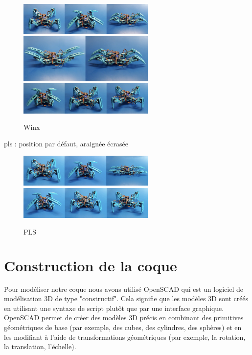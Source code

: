 \begin{figure}[H]
	\begin{center}
		\includegraphics[width=0.6\textwidth]{./img/winx_1}
		\includegraphics[width=0.6\textwidth]{./img/winx_2}
		\includegraphics[width=0.6\textwidth]{./img/winx_3}
		\caption{Winx}
	\end{center}
\end{figure}

pls : position par défaut, araignée écrasée

\begin{figure}[H]
	\begin{center}
		\includegraphics[width=0.6\textwidth]{./img/pls_1}
		\includegraphics[width=0.6\textwidth]{./img/pls_2}
		\caption{PLS}
	\end{center}
\end{figure}

		\section{Construction de la coque}

Pour modéliser notre coque nous avons utilisé OpenSCAD qui est un logiciel de modélisation 3D de type "constructif". 
Cela signifie que les modèles 3D sont créés en utilisant une syntaxe de script plutôt que par une interface graphique. 
OpenSCAD permet de créer des modèles 3D précis en combinant des primitives géométriques de base (par exemple, des cubes, des cylindres, 
des sphères) et en les modifiant à l'aide de transformations géométriques (par exemple, la rotation, la translation, l'échelle).  
\linebreak

